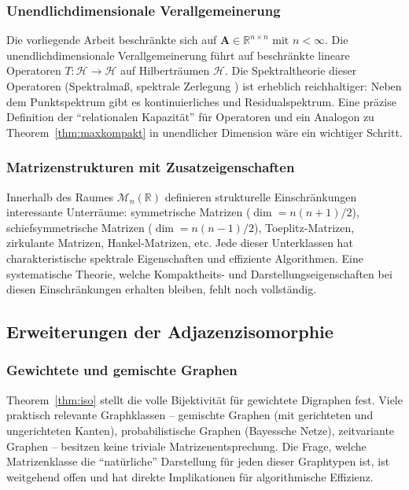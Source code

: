 ﻿\documentclass[12pt, a4paper]{article}
\theoremstyle{definition}
\theoremstyle{remark}
\newcommand{\R}{\mathbb{R}}
\newcommand{\vA}{\bm{A}}
\begin{document}
\subsubsection*{Unendlichdimensionale Verallgemeinerung}

Die vorliegende Arbeit beschränkte sich auf $\vA \in \R^{n \times n}$
mit $n < \infty$. Die unendlichdimensionale Verallgemeinerung führt
auf beschränkte lineare Operatoren $T: \mathcal{H} \to \mathcal{H}$ auf
Hilberträumen $\mathcal{H}$. Die Spektraltheorie dieser Operatoren
(Spektralmaß, spektrale Zerlegung \citep{riesz1955}) ist erheblich
reichhaltiger: Neben dem Punktspektrum gibt es kontinuierliches und
Residualspektrum. Eine präzise Definition der ``relationalen Kapazität''
für Operatoren und ein Analogon zu Theorem~\ref{thm:maxkompakt} in
unendlicher Dimension wäre ein wichtiger Schritt.

\subsubsection*{Matrizenstrukturen mit Zusatzeigenschaften}

Innerhalb des Raumes $\mathcal{M}_n(\R)$ definieren strukturelle
Einschränkungen interessante Unterräume: symmetrische Matrizen
($\dim = n(n+1)/2$), schiefsymmetrische Matrizen ($\dim = n(n-1)/2$),
Toeplitz-Matrizen, zirkulante Matrizen, Hankel-Matrizen, etc.
Jede dieser Unterklassen hat charakteristische spektrale Eigenschaften
und effiziente Algorithmen. Eine systematische Theorie, welche
Kompaktheits- und Darstellungseigenschaften bei diesen Einschränkungen
erhalten bleiben, fehlt noch vollständig.

\subsection{Erweiterungen der Adjazenzisomorphie}
\label{subsec:adj_ausblick}

\subsubsection*{Gewichtete und gemischte Graphen}

Theorem~\ref{thm:iso} stellt die volle Bijektivität für gewichtete
Digraphen fest. Viele praktisch relevante Graphklassen -- gemischte
Graphen (mit gerichteten und ungerichteten Kanten), probabilistische
Graphen (Bayessche Netze), zeitvariante Graphen -- besitzen keine
triviale Matrizenentsprechung. Die Frage, welche Matrizenklasse die
``natürliche'' Darstellung für jeden dieser Graphtypen ist, ist
weitgehend offen und hat direkte Implikationen für algorithmische
Effizienz.
\end{document}
